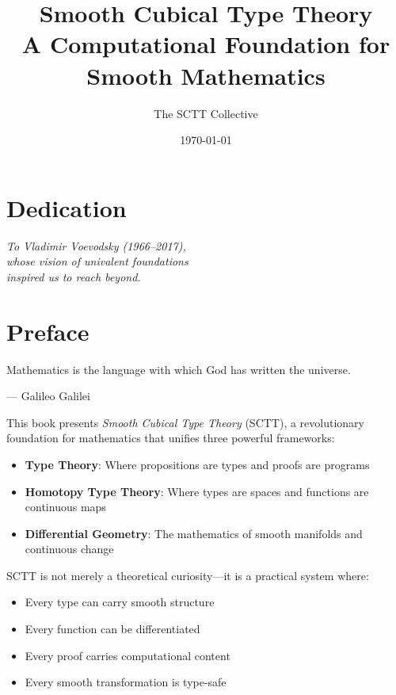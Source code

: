\documentclass[12pt,openright,twoside]{book}
\title{\Huge \textbf{Smooth Cubical Type Theory} \\ 
       \vspace{0.5cm}
       \Large A Computational Foundation for Smooth Mathematics}
\author{\Large The SCTT Collective}
\date{\today}
\theoremstyle{plain}
\theoremstyle{definition}
\theoremstyle{remark}
\begin{document}
\frontmatter
\maketitle

\chapter*{Dedication}
\thispagestyle{empty}
\vspace*{\fill}
\begin{center}
\emph{To Vladimir Voevodsky (1966–2017),\\
whose vision of univalent foundations\\
inspired us to reach beyond.}
\end{center}
\vspace*{\fill}

\tableofcontents
\listoffigures
\listoftables

\chapter{Preface}

\epigraph{Mathematics is the language with which God has written the universe.}{--- Galileo Galilei}

\noindent This book presents \emph{Smooth Cubical Type Theory} (SCTT), a revolutionary foundation for mathematics that unifies three powerful frameworks:
\begin{itemize}
\item \textbf{Type Theory}: Where propositions are types and proofs are programs
\item \textbf{Homotopy Type Theory}: Where types are spaces and functions are continuous maps
\item \textbf{Differential Geometry}: The mathematics of smooth manifolds and continuous change
\end{itemize}

SCTT is not merely a theoretical curiosity—it is a practical system where:
\begin{itemize}
\item Every type can carry smooth structure
\item Every function can be differentiated
\item Every proof carries computational content
\item Every smooth transformation is type-safe
\end{itemize}
\end{document}
